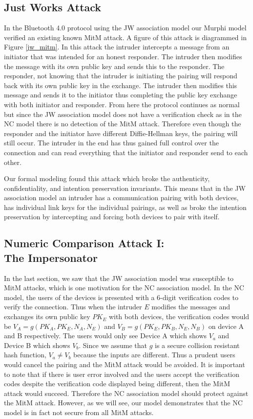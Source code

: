 \documentclass{acm_proc_article-sp}
\begin{document}
\subsection{Just Works Attack}
In the Bluetooth 4.0 protocol using the JW association model our Murphi model verified an existing known MitM attack. A figure of this attack is diagrammed in Figure \ref{jw_mitm}. In this attack the intruder intercepts a message from an initiator that was intended for an honest responder. The intruder then modifies the message with its own public key and sends this to the responder. The responder, not knowing that the intruder is initiating the pairing will respond back with its own public key in the exchange. The intruder then modifies this message and sends it to the initiator thus completing the public key exchange with both initiator and responder. From here the protocol continues as normal but since the JW association model does not have a verification check as in the NC model there is no detection of the MitM attack. Therefore even though the responder and the initiator have different Diffie-Hellman keys, the pairing will still occur. The intruder in the end has thus gained full control over the connection and can read everything that the initiator and responder send to each other.

Our formal modeling found this attack which broke the authenticity, confidentiality, and intention preservation invariants. This means that in the JW association model an intruder has a communication pairing with both devices, has individual link keys for the individual pairings, as well as broke the intention preservation by intercepting and forcing both devices to pair with itself.

\subsection{Numeric Comparison Attack I:\\The Impersonator} %
In the last section, we saw that the JW association model was susceptible to MitM attacks, which is one motivation for the NC association model. In the NC model, the users of the devices is presented with a 6-digit verification codes to verify the connection. Thus when the intruder $E$ modifies the messages and exchanges its own public key $PK_E$ with both devices, the verification codes would be $V_A = g(PK_A, PK_E, N_A, N_E)$ and $V_B = g(PK_E, PK_B, N_E, N_B)$ on device A and B respectively. The users would only see Device A which shows $V_a$ and Device B which shows $V_b$. Since we assume that $g$ is a secure collision resistant hash function, $V_a \neq V_b$ because the inputs are different. Thus a prudent users would cancel the pairing and the MitM attack would be avoided. It is important to note that if there is user error involved and the users accept the verification codes despite the verification code displayed being different, then the MitM attack would succeed. Therefore the NC association model should protect against the MitM attack. However, as we will see, our model demonstrates that the NC model is in fact not secure from all MitM attacks.
\end{document}
